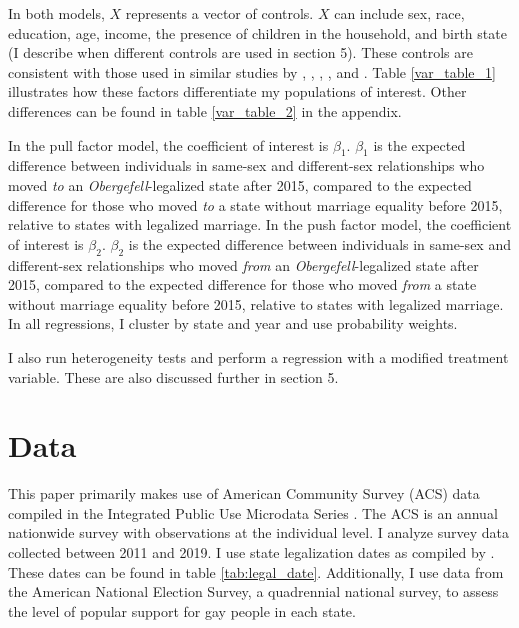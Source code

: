 \documentclass[12pt,letterpaper]{article}
\begin{document}
In both models, $X$ represents a vector of controls. $X$ can include sex, race, education, age, income, the presence of children in the household, and birth state (I describe when different controls are used in section 5). These controls are consistent with those used in similar studies by \citet{1}, \citet{3}, \citet{5}, \citet{7}, and \citet{12}. Table \ref{var_table_1} illustrates how these factors differentiate my populations of interest. Other differences can be found in table \ref{var_table_2} in the appendix.



In the pull factor model, the coefficient of interest is $\beta_1$. $\beta_1$ is the expected difference between individuals in same-sex and different-sex relationships who moved \textit{to} an \textit{Obergefell}-legalized state after 2015, compared to the expected difference for those who moved \textit{to} a state without marriage equality before 2015, relative to states with legalized marriage. In the push factor model, the coefficient of interest is $\beta_2$. $\beta_2$ is the expected difference between individuals in same-sex and different-sex relationships who moved \textit{from} an \textit{Obergefell}-legalized state after 2015, compared to the expected difference for those who moved \textit{from} a state without marriage equality before 2015, relative to states with legalized marriage. In all regressions, I cluster by state and year and use probability weights.

I also run heterogeneity tests and perform a regression with a modified treatment variable. These are also discussed further in section 5.

\section{Data}

This paper primarily makes use of American Community Survey (ACS) data compiled in the Integrated Public Use Microdata Series \citep{28}. The ACS is an annual nationwide survey with observations at the individual level. I analyze survey data collected between 2011 and 2019. I use state legalization dates as compiled by \citet{27}. These dates can be found in table \ref{tab:legal_date}. Additionally, I use data from the American National Election Survey, a quadrennial national survey, to assess the level of popular support for gay people in each state.


\end{document}
